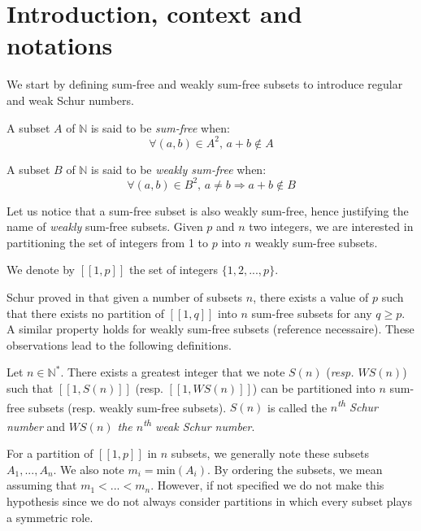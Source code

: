 \section{Introduction, context and notations}

We start by defining sum-free and weakly sum-free subsets to introduce regular and weak Schur numbers.

\begin{definition}
A subset \(A\) of \(\mathbb{N}\) is said to be \textit{sum-free} when:
\[ \forall (a,b) \in A^2 \text{, } a+b \notin A\]
\end{definition}

\begin{definition}
A subset \(B\) of \(\mathbb{N}\) is said to be \textit{weakly sum-free} when:
\[ \forall (a,b) \in B^2 \text{, } a \neq b \Longrightarrow a+b \notin B\]
\end{definition}

Let us notice that a sum-free subset is also weakly sum-free, hence justifying the name of \textit{weakly} sum-free
subsets. Given \(p\) and \(n\) two integers, we are interested in partitioning the set of integers from 1 to \(p\) into
\(n\) weakly sum-free subsets.

\begin{notation}
We denote by \([\![1,p]\!]\) the set of integers \(\{1, 2, ..., p\}\).
\end{notation}

Schur proved in \cite{Schur1917} that given a number of subsets \(n\), there exists a value of \(p\)
such that there exists no partition of \([\![1,q]\!]\) into \(n\) sum-free subsets for any \(q \geqslant p\). A similar
property holds for weakly sum-free subsets (reference necessaire). These observations lead to the following definitions.
\begin{definition}
Let \(n \in \mathbb{N}^*\). There exists a greatest integer that we note \(S(n)\) (\textit{resp. \(WS(n)\)}) such that
\([\![1,S(n)]\!]\) (resp. \([\![1,WS(n)]\!]\)) can be partitioned into \(n\) sum-free subsets (resp. weakly sum-free
subsets). \(S(n)\) is called the \textit{\(n\)\textsuperscript{th} Schur number} and \textit{\(WS(n)\) the
\(n\)\textsuperscript{th} weak
Schur number}.
\end{definition}

\begin{notation}
For a partition of \([\![1, p]\!]\) in \(n\) subsets, we generally note these subsets \(A_1, ..., A_n\). We also note
\(m_i = \text{min}(A_i)\).
By ordering the subsets, we mean assuming that \(m_1 < ... < m_n\). However, if not specified we do not make this
hypothesis since we
do not always consider partitions in which every subset plays a symmetric role.
\end{notation}